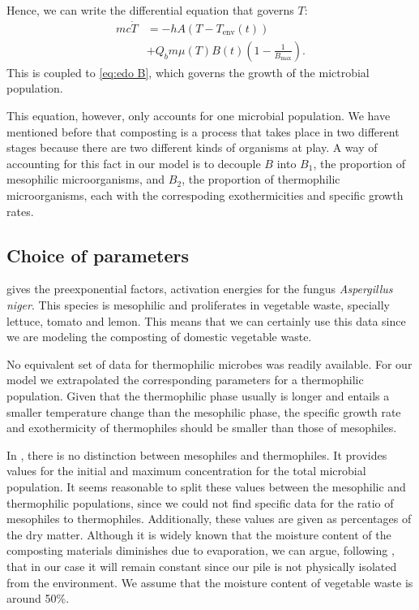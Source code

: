 \documentclass[12pt, a4paper, twocolumn, twoside]{article}
\numberwithin{table}{section}
\numberwithin{figure}{section}
\numberwithin{equation}{section}
\begin{document}
Hence, we can write the differential equation that governs \( T \): 
\begin{equation} \label{eq:edo T}
	\begin{aligned}
		mc\dot{T} & = -hA\left(T - T_\text{env}(t)\right) \\
							& + Q_bm\mu(T)B(t)\left(1 - \frac{1}{B_\text{max}}\right). 
	\end{aligned}
\end{equation}
	This is coupled to \cref{eq:edo B}, which governs the growth of the mictrobial population.  

	This equation, however, only accounts for one microbial population. We have mentioned before that composting is a process that takes place in two different stages because there are two different kinds of organisms at play. A way of accounting for this fact in our model is to decouple \( B \) into \( B_1 \), the proportion of mesophilic microorganisms, and \( B_2 \), the proportion of thermophilic microorganisms, each with the correspoding exothermicities and specific growth rates. 

\subsection{Choice of parameters}
\cite{saucedo} gives the preexponential factors, activation energies for the fungus \textit{Aspergillus niger}. This species is mesophilic and proliferates in vegetable waste, specially lettuce, tomato and lemon. This means that we can certainly use this data since we are modeling the composting of domestic vegetable waste. 

No equivalent set of data for thermophilic microbes was readily available. For our model we extrapolated the corresponding parameters for a thermophilic population. Given that the thermophilic phase usually is longer and entails a smaller temperature change than the mesophilic phase, the specific growth rate and exothermicity of thermophiles should be smaller than those of mesophiles. 

In \cite{saucedo}, there is no distinction between mesophiles and thermophiles. It provides values for the initial and maximum concentration for the total microbial population. It seems reasonable to split these values between the mesophilic and thermophilic populations, since we could not find specific data for the ratio of mesophiles to thermophiles. Additionally, these values are given as percentages of the dry matter. Although it is widely known that the moisture content of the composting materials diminishes due to evaporation, we can argue, following \cite{niceassumptions}, that in our case it will remain constant since our pile is not physically isolated from the environment. We assume that the moisture content of vegetable waste is around 50\%. 
\end{document}
